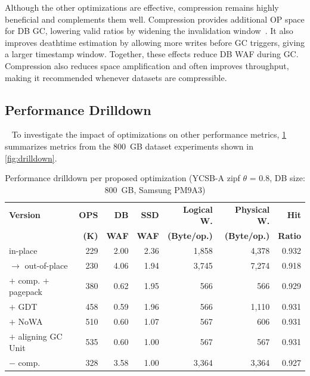 Although the other optimizations are effective, compression remains highly beneficial and complements them well.  
Compression provides additional OP space for DB GC, lowering valid ratios by widening the invalidation window~\cite{ssdiq}.  
It also improves deathtime estimation by allowing more writes before GC triggers, giving a larger timestamp window.  
Together, these effects reduce DB WAF during GC.  
Compression also reduces space amplification and often improves throughput, making it recommended whenever datasets are compressible.

\subsection{Performance Drilldown}~\label{sec:drilldown}
To investigate the impact of optimizations on other performance metrics, 
\cref{tab:drilldown} summarizes metrics from the 800~GB dataset experiments shown in \cref{fig:drilldown}.

\begin{table}[t]
\setlength\doublerulesep{0.5pt}
\setlength{\tabcolsep}{0.08cm} %
\small
\centering
\caption{Performance drilldown per proposed optimization (YCSB-A zipf $\theta$ = 0.8, DB size: 800~GB, Samsung PM9A3)}
\label{tab:drilldown}
\begin{tabular}{l | r r r r r r} %
\toprule[1pt]\midrule[0.3pt]
\textbf{Version} & \textbf{OPS} & \textbf{DB} & \textbf{SSD} & \textbf{Logical W.} & \textbf{Physical W.} &  \textbf{Hit} \\
 & \textbf{(K)} & \textbf{WAF} & \textbf{WAF} & \textbf{(Byte/op.)} & \textbf{(Byte/op.)} & \textbf{Ratio} \\
\midrule
in-place & 229 & 2.00 & 2.36 & 1,858 & 4,378 & 0.932 \\
$\rightarrow$ out-of-place & 230 & 4.06 & 1.94 & 3,745 & 7,274 & 0.918 \\
$+$ comp. $+$ pagepack & 380 & 0.62 & 1.95 & 566 & 566 & 0.929 \\
$+$ GDT & 458 & 0.59 & 1.96 & 566 & 1,110 & 0.931 \\
$+$ NoWA & 510 & 0.60 & 1.07 & 567 & 606 & 0.931 \\
$+$ aligning GC Unit & 535 & 0.60 & 1.00 & 567 & 567 & 0.931 \\
$-$ comp. & 328 & 3.58 & 1.00 & 3,364 & 3,364 & 0.927 \\
\midrule[0.3pt]\bottomrule[1pt]
\end{tabular}
\end{table}

